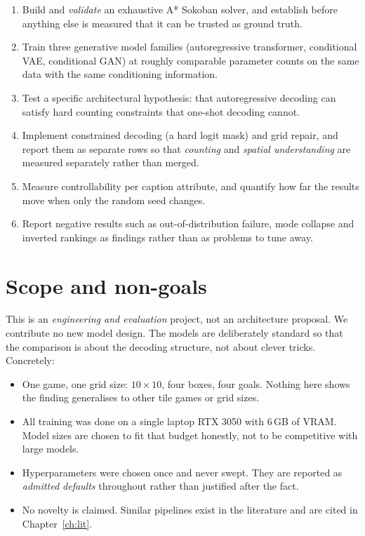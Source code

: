 \documentclass[11pt,a4paper]{report}
\begin{document}
\begin{enumerate}[leftmargin=1.5em,itemsep=2pt]
\item Build and \emph{validate} an exhaustive A* Sokoban solver, and establish
      before anything else is measured that it can be trusted as ground truth.
\item Train three generative model families (autoregressive transformer,
      conditional VAE, conditional GAN) at roughly comparable parameter
      counts on the same data with the same conditioning information.
\item Test a specific architectural hypothesis: that autoregressive decoding can
      satisfy hard counting constraints that one-shot decoding cannot.
\item Implement constrained decoding (a hard logit mask) and grid repair, and
      report them as separate rows so that \emph{counting} and \emph{spatial
      understanding} are measured separately rather than merged.
\item Measure controllability per caption attribute, and quantify how far the
      results move when only the random seed changes.
\item Report negative results such as out-of-distribution failure, mode
      collapse and inverted rankings as findings rather than as problems to
      tune away.
\end{enumerate}

\section{Scope and non-goals}

This is an \emph{engineering and evaluation} project, not an architecture
proposal. We contribute no new model design. The models are deliberately
standard so that the comparison is about the decoding structure, not about
clever tricks. Concretely:

\begin{itemize}[leftmargin=1.5em,itemsep=1pt]
\item One game, one grid size: $10\times10$, four boxes, four goals. Nothing
      here shows the finding generalises to other tile games or grid sizes.
\item All training was done on a single laptop RTX 3050 with 6\,GB of VRAM. Model
      sizes are chosen to fit that budget honestly, not to be competitive with
      large models.
\item Hyperparameters were chosen once and never swept. They are reported as
      \emph{admitted defaults} throughout rather than justified after the fact.
\item No novelty is claimed. Similar pipelines exist in the literature and are
      cited in Chapter~\ref{ch:lit}.
\end{itemize}
\end{document}
